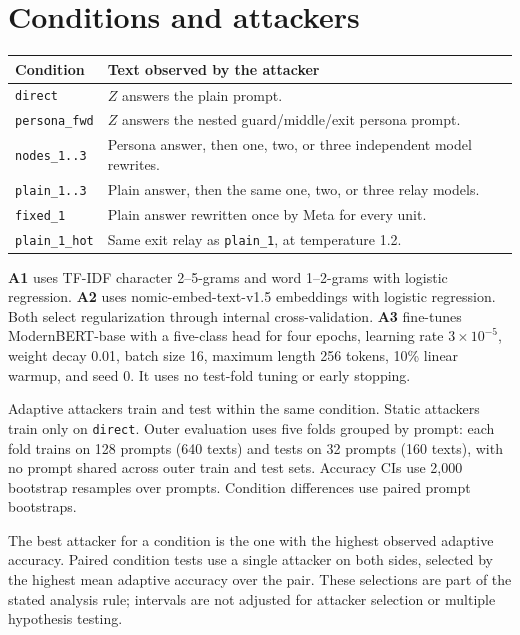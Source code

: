 \documentclass[11pt]{article}
\newcommand{\cond}[1]{\texttt{#1}}
\begin{document}
\clearpage
\section{Conditions and attackers}
\begin{center}
\small
\begin{tabularx}{\linewidth}{lX}
\toprule
Condition & Text observed by the attacker \\
\midrule
\cond{direct} & $Z$ answers the plain prompt. \\
\cond{persona\_fwd} & $Z$ answers the nested guard/middle/exit persona prompt. \\
\cond{nodes\_1..3} & Persona answer, then one, two, or three independent model rewrites. \\
\cond{plain\_1..3} & Plain answer, then the same one, two, or three relay models. \\
\cond{fixed\_1} & Plain answer rewritten once by Meta for every unit. \\
\cond{plain\_1\_hot} & Same exit relay as \cond{plain\_1}, at temperature 1.2. \\
\bottomrule
\end{tabularx}
\end{center}

\textbf{A1} uses TF-IDF character 2--5-grams and word 1--2-grams with logistic
regression. \textbf{A2} uses nomic-embed-text-v1.5 embeddings with logistic
regression. Both select regularization through internal cross-validation.
\textbf{A3} fine-tunes ModernBERT-base with a five-class head for four epochs,
learning rate $3\times10^{-5}$, weight decay 0.01, batch size 16, maximum
length 256 tokens, 10\% linear warmup, and seed 0. It uses no test-fold tuning
or early stopping.

Adaptive attackers train and test within the same condition. Static attackers
train only on \cond{direct}. Outer evaluation uses five folds grouped by
prompt: each fold trains on 128 prompts (640 texts) and tests on 32 prompts
(160 texts), with no prompt shared across outer train and test sets.
Accuracy CIs use 2,000 bootstrap resamples over prompts. Condition differences
use paired prompt bootstraps.

The best attacker for a condition is the one with the highest observed
adaptive accuracy. Paired condition tests use a single attacker on both sides,
selected by the highest mean adaptive accuracy over the pair. These selections
are part of the stated analysis rule; intervals are not adjusted for attacker
selection or multiple hypothesis testing.
\end{document}

